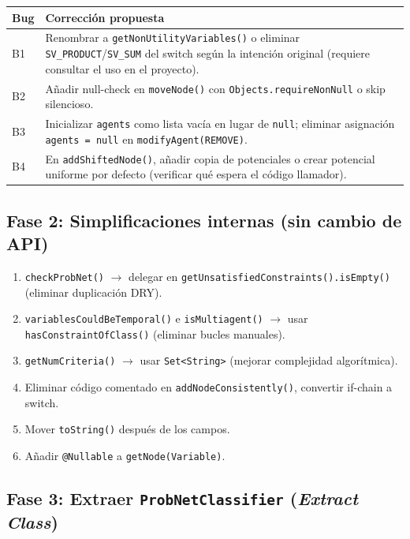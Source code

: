 \documentclass[11pt,a4paper]{article}
\newcommand{\code}[1]{\texttt{#1}}
\begin{document}
\begin{center}
\begin{tabular}{lp{9cm}}
\toprule
\textbf{Bug} & \textbf{Correcci\'on propuesta} \\
\midrule
B1 & Renombrar a \code{getNonUtilityVariables()} o eliminar
     \code{SV\_PRODUCT}/\code{SV\_SUM} del switch seg\'un la intenci\'on
     original (requiere consultar el uso en el proyecto). \\
B2 & A\~nadir null-check en \code{moveNode()} con
     \code{Objects.requireNonNull} o skip silencioso. \\
B3 & Inicializar \code{agents} como lista vac\'ia en lugar de
     \code{null}; eliminar asignaci\'on \code{agents = null} en
     \code{modifyAgent(REMOVE)}. \\
B4 & En \code{addShiftedNode()}, a\~nadir copia de potenciales o crear
     potencial uniforme por defecto (verificar qu\'e espera el
     c\'odigo llamador). \\
\bottomrule
\end{tabular}
\end{center}

\subsection{Fase 2: Simplificaciones internas (sin cambio de API)}

\begin{enumerate}
  \item \code{checkProbNet()} $\to$ delegar en
        \code{getUnsatisfiedConstraints().isEmpty()} (eliminar
        duplicaci\'on DRY).
  \item \code{variablesCouldBeTemporal()} e \code{isMultiagent()} $\to$
        usar \code{hasConstraintOfClass()} (eliminar bucles manuales).
  \item \code{getNumCriteria()} $\to$ usar \code{Set<String>} (mejorar
        complejidad algor\'itmica).
  \item Eliminar c\'odigo comentado en \code{addNodeConsistently()},
        convertir if-chain a switch.
  \item Mover \code{toString()} despu\'es de los campos.
  \item A\~nadir \code{@Nullable} a \code{getNode(Variable)}.
\end{enumerate}

\subsection{Fase 3: Extraer \code{ProbNetClassifier} (\emph{Extract Class})}
\end{document}
